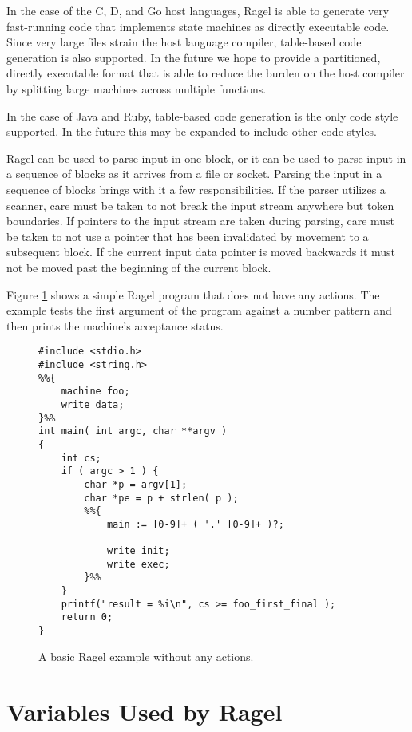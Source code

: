 \documentclass[letterpaper,11pt,oneside]{book}
\begin{document}
In the case of the C, D, and Go host languages, Ragel is able to generate very
fast-running code that implements state machines as directly executable code.
Since very large files strain the host language compiler, table-based code
generation is also supported. In the future we hope to provide a partitioned,
directly executable format that is able to reduce the burden on the host
compiler by splitting large machines across multiple functions.

In the case of Java and Ruby, table-based code generation is the only code
style supported. In the future this may be expanded to include other code
styles.

Ragel can be used to parse input in one block, or it can be used to parse input
in a sequence of blocks as it arrives from a file or socket.  Parsing the input
in a sequence of blocks brings with it a few responsibilities. If the parser
utilizes a scanner, care must be taken to not break the input stream anywhere
but token boundaries.  If pointers to the input stream are taken during
parsing, care must be taken to not use a pointer that has been invalidated by
movement to a subsequent block.  If the current input data pointer is moved
backwards it must not be moved past the beginning of the current block.

Figure \ref{basic-example} shows a simple Ragel program that does not have any
actions. The example tests the first argument of the program against a number
pattern and then prints the machine's acceptance status.

\begin{figure}
\small
\begin{verbatim}
#include <stdio.h>
#include <string.h>
%%{
    machine foo;
    write data;
}%%
int main( int argc, char **argv )
{
    int cs;
    if ( argc > 1 ) {
        char *p = argv[1];
        char *pe = p + strlen( p );
        %%{ 
            main := [0-9]+ ( '.' [0-9]+ )?;

            write init;
            write exec;
        }%%
    }
    printf("result = %i\n", cs >= foo_first_final );
    return 0;
}
\end{verbatim}
\caption{A basic Ragel example without any actions.
}
\label{basic-example}
\end{figure}

\section{Variables Used by Ragel}
\end{document}
